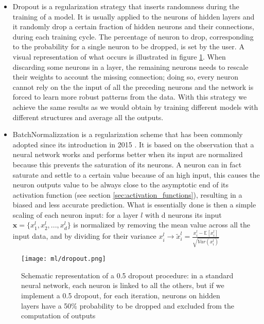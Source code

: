 \documentclass[11pt]{report}
\begin{document}
\begin{itemize}
\item Dropout is a regularization strategy that inserts randomness during the training of a model.
It is usually applied to the neurons of hidden layers and it randomly drop a certain fraction of hidden neurons and their connections, during each training cycle.
The percentage of neuron to drop, corresponding to the probability for a single neuron to be dropped, is set by the user.
A visual representation of what occurs is illustrated in figure \ref{fig:dropout}.
When discarding some neurons in a layer, the remaining neurons needs to rescale their weights to account the missing connection; doing so, every neuron cannot rely on the the input of all the preceding neurons and the network is forced to learn more robust patterns from the data.
With this strategy we achieve the same results as we would obtain by training different models with different structures and average all the outputs.

\item BatchNormalizzation is a regularization scheme that has been commonly adopted since its introduction in 2015 \cite{ioffe2015}.
It is based on the observation that a neural network works and performs better when its input are normalized because this prevents the saturation of its neurons.
A neuron can in fact saturate and settle to a certain value because of an high input, this causes the neuron outputs value to be always close to the asymptotic end of its activation function (see section \ref{sec:activation_functions}), resulting in a biased and less accurate prediction.
What is essentially done is then a simple scaling of each neuron input: for a layer $l$ with d neurons its input $\mathbf{x} = \{x_1^l, x_2^l, ..., x_d^l\}$ is normalized by removing the mean value across all the input data, and by dividing for their variance $x_i^l \rightarrow \tilde x_i^l = \frac{x_i^{l} - \mathbb{E}[x_i^l]}{\sqrt{Var(x_i^l)}} $

\end{itemize}

\begin{figure}
\centering
\texttt{[image: ml/dropout.png]}
\caption{Schematic representation of a 0.5 dropout procedure: in a standard neural network, each neuron is linked to all the others, but if we implement a 0.5 dropout, for each iteration, neurons on hidden layers have a 50\% probability to be dropped and excluded from the computation of outputs}
\label{fig:dropout}
\end{figure}
\end{document}
